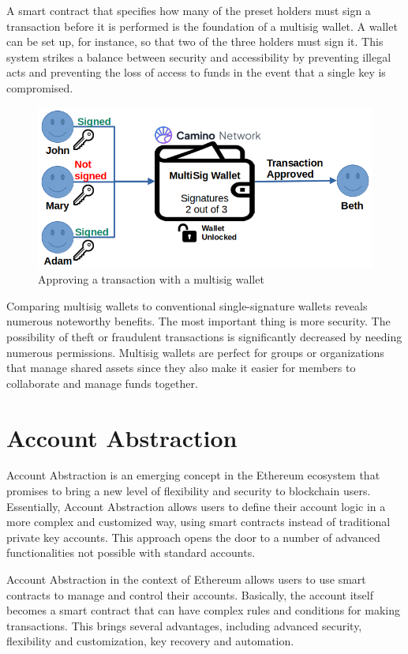 A smart contract that specifies how many of the preset holders must sign a transaction before it is performed is the foundation of a multisig wallet. A wallet can be set up, for instance, so that two of the three holders must sign it. This system strikes a balance between security and accessibility by preventing illegal acts and preventing the loss of access to funds in the event that a single key is compromised.
\begin{figure}[htbp]
	\centering
	\includegraphics[scale=0.65]{./figures/multisig-flow.png}
	\caption{Approving a transaction with a multisig wallet}
\end{figure}


Comparing multisig wallets to conventional single-signature wallets reveals numerous noteworthy benefits. The most important thing is more security. The possibility of theft or fraudulent transactions is significantly decreased by needing numerous permissions. Multisig wallets are perfect for groups or organizations that manage shared assets since they also make it easier for members to collaborate and manage funds together.

 \section{Account Abstraction}
\label{sec:ch2sec6} 
Account Abstraction is an emerging concept in the Ethereum ecosystem that promises to bring a new level of flexibility and security to blockchain users. Essentially, Account Abstraction allows users to define their account logic in a more complex and customized way, using smart contracts instead of traditional private key accounts. This approach opens the door to a number of advanced functionalities not possible with standard accounts.

Account Abstraction in the context of Ethereum allows users to use smart contracts to manage and control their accounts. Basically, the account itself becomes a smart contract that can have complex rules and conditions for making transactions. This brings several advantages, including advanced security, flexibility and customization, key recovery and automation.

